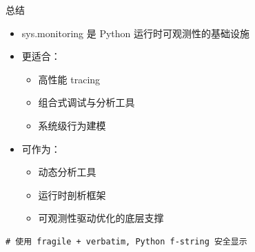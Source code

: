 \documentclass{beamer}
\begin{document}
\begin{frame}[fragile]{总结}
\begin{itemize}
  \item sys.monitoring 是 Python 运行时可观测性的基础设施
  \item 更适合：
    \begin{itemize}
      \item 高性能 tracing
      \item 组合式调试与分析工具
      \item 系统级行为建模
    \end{itemize}
  \item 可作为：
    \begin{itemize}
      \item 动态分析工具
      \item 运行时剖析框架
      \item 可观测性驱动优化的底层支撑
    \end{itemize}
\end{itemize}

\begin{verbatim}
# 使用 fragile + verbatim, Python f-string 安全显示
\end{verbatim}
\end{frame}
\end{document}
